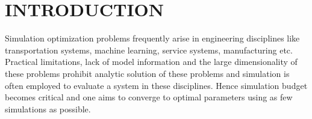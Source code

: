 \documentclass[letterpaper, 10 pt, conference]{ieeeconf}  %
\begin{document}
% 
 
\section{INTRODUCTION}
Simulation optimization problems frequently arise in engineering disciplines like 
transportation systems, machine learning, service systems, manufacturing etc. 
Practical limitations, lack of model information and the large dimensionality of these 
problems prohibit analytic solution of these problems and simulation is often employed to 
evaluate a system in these disciplines. Hence simulation budget becomes critical and 
one aims to converge to optimal parameters using as few simulations as possible.
\end{document}
